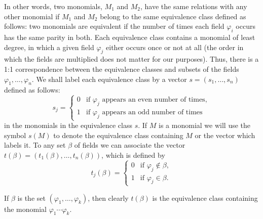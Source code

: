 In other words, two monomials, $M_1$ and $M_2$, have the same relations with
any other monomial if $M_1$ and $M_2$ belong to the same equivalence class
defined as follows: two monomials are equivalent if the number of times each
field $\varphi_i$ occurs has the same parity in both.  Each equivalence class
contains a monomial of least degree, in which a given field $\varphi_j$ either
occurs once or not at all (the order in which the fields are multiplied does
not matter for our purposes).  Thus, there is a 1:1 correspondence between
the equivalence classes and subsets of the fields
$\varphi_1,\ldots,\varphi_n$.  We shall label each equivalence class by a
vector $s=(s_1,\ldots,s_n)$ defined as follows:
\begin{equation*}
  s_j=\begin{cases}0&\text{if }\varphi_j\text{ appears an even number of times},\\
                    1&\text{if }\varphi_j\text{ appears an odd number of times}
       \end{cases}
\end{equation*}
in the monomials in the equivalence class $s$.  If $M$ is a monomial we will
use the symbol $s(M)$ to denote the equivalence class containing
$M$ or the vector which labels it.  To any set $\beta$ of fields we can
associate the vector $t(\beta)=(t_1(\beta),\ldots,t_n(\beta))$, which is defined
by
\begin{equation*}
  t_j(\beta)=\begin{cases}
    0&\text{if }\varphi_j\notin\beta,\\
    1&\text{if }\varphi_j\in\beta.
  \end{cases}
\end{equation*}

If $\beta$ is the set $(\varphi_1,\ldots,\varphi_k)$, then clearly $t(\beta)$
is the equivalence class containing the monomial
$\varphi_1\cdots\varphi_k$.


